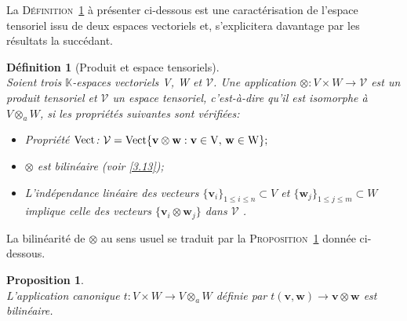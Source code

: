 \documentclass[11pt,a4paper,oneside]{book}
\newtheorem{prop}{Proposition}[chapter]
\newtheorem{defi}{Définition}[chapter]
\def\K{\mathbb K}
\def\V{\mathcal V}
\def\v{\mathbf v}
\def\w{\mathbf w}
\def\spam{\rm Vect}
\newcommand{\defref}[1]{\textsc{Définition}~\ref{#1}}
\newcommand{\propref}[1]{\textsc{Proposition}~\ref{#1}}
\begin{document}
La \defref{defitensor} à présenter ci-dessous est une caractérisation de l'espace tensoriel issu de deux espaces vectoriels et, s'explicitera davantage par les résultats la succédant.

\begin{defi}[Produit et espace tensoriels]\label{defitensor}
	\emph{\\}
	Soient  trois $ \K $-espaces vectoriels V, W et $ \V $. Une application $ \otimes :V\times W \rightarrow  $$ \mathcal{V} $ est un produit tensoriel et $ \mathcal{V} $ un espace tensoriel, c'est-à-dire qu'il est isomorphe à $ V\otimes_{a} W$, si les propriétés suivantes sont vérifiées:
	\begin{itemize}
		\item[$ (1) $]
		Propriété $ \spam $: $ \mathcal{V} =\spam\{\v\otimes \w :\v\in V,\, \w\in W \};$
		\item[$ (2) $]
		$ \otimes $ est bilinéaire (voir \eqref{3.13});
		\item[$ (3) $]
		L'indépendance linéaire des vecteurs $ \{\v_{i}\}_{1\leq i\leq n}\subset V $ et $ \{\w_{j}\}_{1\leq j\leq m}\subset W $ implique celle des vecteurs $ \{\v_{i}\otimes \w_{j}\} $ dans $ \mathcal{V} $ \cite[p. 54]{hackbusch2012tensor}.
	\end{itemize}
\end{defi}
La bilinéarité de $ \otimes $ au sens usuel se traduit par la \propref{proptensor} donnée ci-dessous.
\begin{prop}\label{proptensor}
	\emph{\\}
	L’application  canonique $t:V\times W\rightarrow V\otimes_{a} W$ définie par $t (\v,\w) \longrightarrow \v\otimes \w $ est bilinéaire. 
\end{prop}
\end{document}
